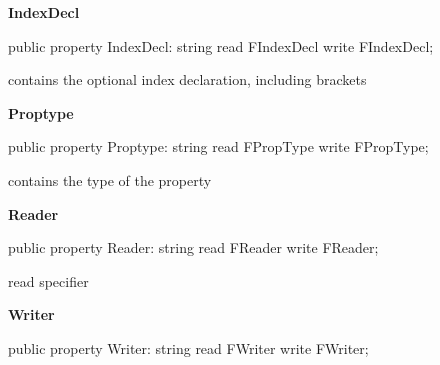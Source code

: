 \documentclass{report}
\newif\ifpdf
\begin{document}
\begin{list}{}{
\setlength{\itemindent}{0cm}
\setlength{\listparindent}{0cm}
\setlength{\leftmargin}{\evensidemargin}
\addtolength{\leftmargin}{\tmplength}
\settowidth{\labelsep}{X}
\addtolength{\leftmargin}{\labelsep}
\setlength{\labelwidth}{\tmplength}
}
\label{PasDoc_Items.TPasProperty-IndexDecl}
\item[\textbf{IndexDecl}\hfill]
\ifpdf
\begin{flushleft}
\fi
\begin{ttfamily}
public property IndexDecl: string read FIndexDecl write FIndexDecl;\end{ttfamily}

\ifpdf
\end{flushleft}
\fi


\par contains the optional index declaration, including brackets\label{PasDoc_Items.TPasProperty-Proptype}
\item[\textbf{Proptype}\hfill]
\ifpdf
\begin{flushleft}
\fi
\begin{ttfamily}
public property Proptype: string read FPropType write FPropType;\end{ttfamily}

\ifpdf
\end{flushleft}
\fi


\par contains the type of the property\label{PasDoc_Items.TPasProperty-Reader}
\item[\textbf{Reader}\hfill]
\ifpdf
\begin{flushleft}
\fi
\begin{ttfamily}
public property Reader: string read FReader write FReader;\end{ttfamily}

\ifpdf
\end{flushleft}
\fi


\par read specifier\label{PasDoc_Items.TPasProperty-Writer}
\item[\textbf{Writer}\hfill]
\ifpdf
\begin{flushleft}
\fi
\begin{ttfamily}
public property Writer: string read FWriter write FWriter;\end{ttfamily}

\ifpdf
\end{flushleft}
\fi



\end{list}
\end{document}
